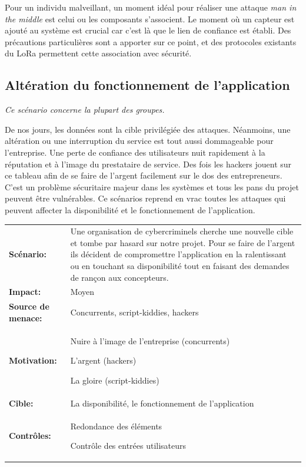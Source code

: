 \documentclass[12pt]{article}
\begin{document}
Pour un individu malveillant, un moment idéal pour réaliser une attaque \emph{man in the middle} est celui ou les composants s'associent. Le moment où un capteur est ajouté au système est crucial car c'est là que le lien de confiance est établi. Des précautions particulières sont a apporter sur ce point, et des protocoles existants du LoRa permettent cette association avec sécurité.


\subsection{Altération du fonctionnement de l'application}

\emph{Ce scénario concerne la plupart des groupes.}
\medskip

De nos jours, les données sont la cible privilégiée des attaques. Néanmoins, une altération ou une interruption du service est tout aussi dommageable pour l'entreprise. Une perte de confiance des utilisateurs nuit rapidement à la réputation et à l'image du prestataire de service. Des fois les hackers jouent sur ce tableau afin de se faire de l'argent facilement sur le dos des entrepreneurs. C'est un problème sécuritaire majeur dans les systèmes et tous les pans du projet peuvent être vulnérables. Ce scénarios reprend en vrac toutes les attaques qui peuvent affecter la disponibilité et le fonctionnement de l'application.
\medskip

\renewcommand{\arraystretch}{1.6}
\begin{tabular}{@{}p{4cm}p{12cm}}
\textbf{Scénario:} &  Une organisation de cybercriminels cherche une nouvelle cible et tombe par hasard sur notre projet. Pour se faire de l'argent ils décident de compromettre l'application en la ralentissant ou en touchant sa disponibilité tout en faisant des demandes de rançon aux concepteurs. \\
\textbf{Impact:} & Moyen \\
\textbf{Source de menace: } & Concurrents, script-kiddies, hackers \\
\textbf{Motivation:} & Nuire à l'image de l'entreprise (concurrents)

L'argent (hackers)

La gloire (script-kiddies)\\
\textbf{Cible:} & La disponibilité, le fonctionnement de l'application\\
\textbf{Contrôles:} & Redondance des éléments

Contrôle des entrées utilisateurs
\end{tabular}
\renewcommand{\arraystretch}{1}
\end{document}
